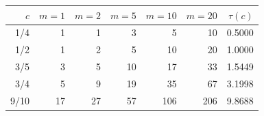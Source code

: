 \begin{tabular}{rrrrrrr}\toprule
$c$ & $m=1$ & $m=2$ & $m=5$ & $m=10$ & $m=20$ & $\tau(c)$ \\\midrule
1/4 & 1 & 1 & 3 & 5 & 10 & 0.5000 \\
1/2 & 1 & 2 & 5 & 10 & 20 & 1.0000 \\
3/5 & 3 & 5 & 10 & 17 & 33 & 1.5449 \\
3/4 & 5 & 9 & 19 & 35 & 67 & 3.1998 \\
9/10 & 17 & 27 & 57 & 106 & 206 & 9.8688 \\
\bottomrule\end{tabular}
